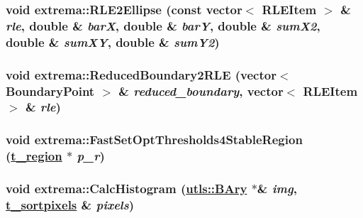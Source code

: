 \hypertarget{namespaceextrema_905de593c22e4be0daf5d1109aaa527c}{
\subsubsection[RLE2Ellipse]{\setlength{\rightskip}{0pt plus 5cm}void extrema::RLE2Ellipse (const vector$<$ RLEItem $>$ \& {\em rle}, double \& {\em bar\-X}, double \& {\em bar\-Y}, double \& {\em sum\-X2}, double \& {\em sum\-XY}, double \& {\em sum\-Y2})}}
\label{namespaceextrema_905de593c22e4be0daf5d1109aaa527c}


\hypertarget{namespaceextrema_58b3b98f8ba949fa8d8ec9dc449d52f9}{
\subsubsection[ReducedBoundary2RLE]{\setlength{\rightskip}{0pt plus 5cm}void extrema::Reduced\-Boundary2RLE (vector$<$ Boundary\-Point $>$ \& {\em reduced\_\-boundary}, vector$<$ RLEItem $>$ \& {\em rle})}}
\label{namespaceextrema_58b3b98f8ba949fa8d8ec9dc449d52f9}


\hypertarget{namespaceextrema_2a889580edf196cf69706d7fa8db0f48}{
\subsubsection[FastSetOptThresholds4StableRegion]{\setlength{\rightskip}{0pt plus 5cm}void extrema::Fast\-Set\-Opt\-Thresholds4Stable\-Region (\hyperlink{namespaceextrema_69226559b69da898aa092cbdd82db4ac}{t\_\-region} $\ast$ {\em p\_\-r})}}
\label{namespaceextrema_2a889580edf196cf69706d7fa8db0f48}


\hypertarget{namespaceextrema_2992a096fc1f046963a07489ab316d30}{
\subsubsection[CalcHistogram]{\setlength{\rightskip}{0pt plus 5cm}void extrema::Calc\-Histogram (\hyperlink{structutls_1_1Ary}{utls::BAry} $\ast$\& {\em img}, \hyperlink{namespaceextrema_fe82307c3b119c3da09a001341fa3560}{t\_\-sortpixels} \& {\em pixels})}}
\label{namespaceextrema_2992a096fc1f046963a07489ab316d30}


